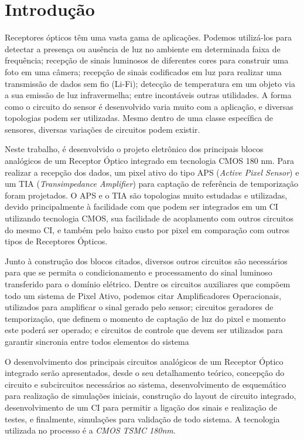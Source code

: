 \chapter[Introdução]{Introdução}
Receptores ópticos têm uma vasta gama de aplicações. Podemos utilizá-los para detectar a presença ou ausência de luz no ambiente em determinada faixa de frequência; recepção de sinais luminosos de diferentes cores para construir uma foto em uma câmera; recepção de sinais codificados em luz para realizar uma transmissão de dados sem fio (Li-Fi); detecção de temperatura em um objeto via a sua emissão de luz infravermelha; entre incontáveis outras utilidades. A forma como o circuito do sensor é desenvolvido varia muito com a aplicação, e diversas topologias podem ser utilizadas. Mesmo dentro de uma classe específica de sensores, diversas variações de circuitos podem existir.

Neste trabalho, é desenvolvido o projeto eletrônico dos principais blocos analógicos de um Receptor \'Optico integrado em tecnologia CMOS 180 nm. Para realizar a recepção dos dados, um pixel ativo do tipo APS (\textit{Active Pixel Sensor}) e um TIA (\textit{Transimpedance Amplifier}) para captação de refer\^encia de temporização foram projetados. O APS e o TIA são topologias muito estudadas e utilizadas, devido principalmente à facilidade com que podem ser integrados em um CI utilizando tecnologia CMOS, sua facilidade de acoplamento com outros circuitos do mesmo CI, e também pelo baixo custo por pixel em comparação com outros tipos de Receptores Ópticos. 

Junto à construção dos blocos citados, diversos outros circuitos são necessários para que se permita o condicionamento e processamento do sinal luminoso transferido para o domínio elétrico. Dentre os circuitos auxiliares que compõem todo um sistema de Pixel Ativo, podemos citar Amplificadores Operacionais, utilizados para amplificar o sinal gerado pelo sensor; circuitos geradores de temporização, que definem o momento de captação de luz do pixel e momento este poderá ser operado; e circuitos de controle que devem ser utilizados para garantir sincronia entre todos elementos do sistema

O desenvolvimento dos principais circuitos analógicos de um Receptor Óptico integrado serão apresentados, desde o seu detalhamento teórico, concepção do circuito e subcircuitos necessários ao sistema, desenvolvimento de esquemático para realização de simulações iniciais, construção do layout de circuito integrado, desenvolvimento de um CI para permitir a ligação dos sinais e realização de testes, e finalmente, simulações para validação de todo sistema. A tecnologia utilizada no processo é a \textit{CMOS TSMC 180nm}.

